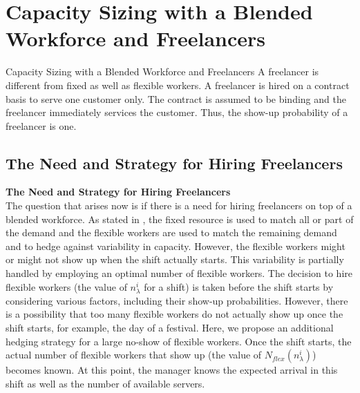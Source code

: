 \documentclass[8pt]{beamer}
\begin{document}
\section{Capacity Sizing with a Blended Workforce and Freelancers}
\begin{frame}{Capacity Sizing with a Blended Workforce and Freelancers}
A freelancer is different from fixed as well as flexible workers. A freelancer is hired on a contract basis to serve one customer only. The contract is assumed to be binding and the freelancer immediately services the customer. Thus, the show-up probability of a freelancer is one.  \\
\bigskip
\subsection{The Need and Strategy for Hiring Freelancers} 
\textbf{The Need and Strategy for Hiring Freelancers} \\ 
The question that arises now is if there is a need for hiring freelancers on top of a blended workforce. As stated in \cite{dong}, the fixed resource is used to match all or part of the demand and the flexible workers are used to match the remaining demand and to hedge against variability in capacity. However, the flexible workers might or might not show up when the shift actually starts. This variability is partially handled by employing an optimal number of flexible workers. The decision to hire flexible workers (the value of $n_{\lambda}^i$ for a shift) is taken before the shift starts by considering various factors, including their show-up probabilities. However, there is a possibility that too many flexible workers do not actually show up once the shift starts, for example, the day of a festival. Here, we propose an additional hedging strategy for a large no-show of flexible workers. Once the shift starts, the actual number of flexible workers that show up (the value of $N_{flex}(n_{\lambda}^i)$) becomes known. At this point, the manager knows the expected arrival in this shift as well as the number of available servers. 
\end{frame}
\end{document}
